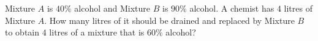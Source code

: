 Mixture $A$ is $40\%$ alcohol and Mixture $B$ is $90\%$ alcohol. A chemist has $4$ litres of Mixture $A$. How many litres of it should be drained and replaced by Mixture $B$ to obtain $4$ litres of a mixture that is $60\%$ alcohol?
